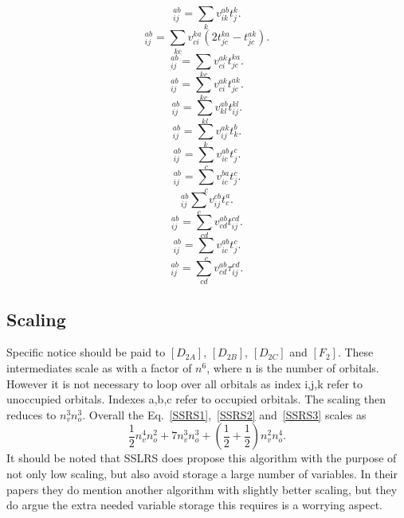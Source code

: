 \documentclass[graybox,sectrefs,envcountresetchap,open=right]{svmonodo}
\begin{document}
\begin{equation}
[D_1]_{ij}^{ab} = \sum_k v_{ik}^{ab} t_j^k .
\end{equation}
\begin{equation}
[D_{2A}]_{ij}^{ab} = \sum_{kc}
v_{ci}^{ka} (2 t_{jc}^{ka} - t_{jc}^{ak}) .
\end{equation}
\begin{equation}
[D_{2B}]_{ij}^{ab} = \sum_{kc}
v_{ci}^{ak} t_{jc}^{ka} .
\end{equation}
\begin{equation}
[D_{2C}]_{ij}^{ab} = \sum_{kc}
v_{ci}^{ak} t_{jc}^{ak} .
\end{equation}
\begin{equation}
[B_2]_{ij}^{ab} = \sum_{kl} v_{kl}^{ab} t_{ij}^{kl} .
\end{equation}
\begin{equation}
[E_1^*]_{ij}^{ab} = \sum_k v_{ij}^{ak} t_k^b .
\end{equation}
\begin{equation}
[F_{12}]_{ij}^{ab} = \sum_c
v_{ic}^{ab} t_j^c .
\end{equation}
\begin{equation}
[F_{11}]_{ij}^{ab} = \sum_c v_{ic}^{ba} t_j^c .
\end{equation}
\begin{equation}
[E_{11}]_{ij}^{ab} \sum_c v_{ij}^{cb} t_c^a .
\end{equation}
\begin{equation}
[D_2]_{ij}^{ab} = \sum_{cd} v_{cd}^{ab} t_{ij}^{cd} .
\end{equation}
\begin{equation}
[E_1]_{ij}^{ab} = \sum_c v_{ic}^{ab} t_j^c .
\end{equation}
\begin{equation}
[F_2]_{ij}^{ab} = \sum_{cd} v_{cd}^{ab} \tau_{ij}^{cd} .
\end{equation}
\subsection{Scaling}
Specific notice should be paid to $[D_{2A}]$, $[D_{2B}]$, $[D_{2C}]$ and $[F_{2}]$. These intermediates scale as with a factor of $n^6$, where n is the number of orbitals. However it is not necessary to loop over all orbitals as index i,j,k refer to unoccupied orbitals. Indexes a,b,c refer to occupied orbitals. The scaling then reduces to $n_v^3 n_o^3$. Overall the Eq.~\ref{SSRS1},~\ref{SSRS2} and~\ref{SSRS3} scales as 
\begin{equation}
\frac{1}{2} n_v^4 n_o^2 + 7 n_v^3 n_o^3 + \left( \frac{1}{2} + \frac{1}{2} \right) n_v^2 n_o^4 . 
\end{equation} 
It should be noted that SSLRS does propose this algorithm with the purpose of not only low scaling, but also avoid storage a large number of variables. In their papers they do mention another algorithm with slightly better scaling, but they do argue the extra needed variable storage this requires is a worrying aspect. 
\end{document}
